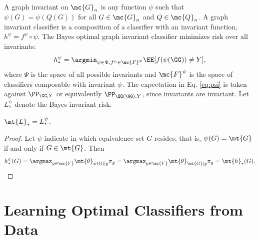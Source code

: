 \documentclass[10pt,journal,cspaper,compsoc]{IEEEtran}
\newcommand{\Qs}{Q}
\begin{document}
A graph invariant on $\mc{G}_n$ is any function $\psi$  such that $\psi(G)=\psi(\Qs(G))$ for all $G \in \mc{G}_n$ and $\Qs \in \mc{Q}_n$.  A graph invariant classifier is a composition of a classifier with an invariant function, $h^\psi=f^\psi \circ \psi$.  The Bayes optimal graph invariant classifier minimizes risk over all invariants: 
\begin{align} \label{eq:psi}
	h_*^{\psi}=\argmin_{\psi \in \Psi, f^{\psi} \in \mc{F}^{\psi}} \EE[f(\psi(\GG))\neq Y],
\end{align}
where $\Psi$ is the space of all possible invariants and $\mc{F}^{\psi}$ is the space of classifiers composable with invariant $\psi$. The expectation in Eq. \eqref{eq:psi} is taken against $\PP_{\GG,Y}$ or equivalently $\PP_{\QQ(\GG),Y}$, since invariants are invariant.
  Let $L_*^{\psi}$ denote the Bayes invariant risk.  
\begin{thm} \label{thm:3}
	$\mt{L}_*=L_*^\psi$.
\end{thm}

\begin{proof}
Let $\psi$ indicate in which equivalence set $G$ resides; that is,  $\psi(G)=\mt{G}$ if and only if $G \in \mt{G}$.  Then
\begin{align}
	h^{\psi}_*(G)= \argmax_{y \in \mc{Y}} \mt{\theta}_{\psi(G)|y} \pi_y = \argmax_{y \in \mc{Y}} \mt{\theta}_{\mt{G}|y} \pi_y = \mt{h}_*(G).
\end{align}
\end{proof}



\section{Learning Optimal Classifiers from Data} %
\label{sec:learning_optimal_classifiers_from_data}
\end{document}

